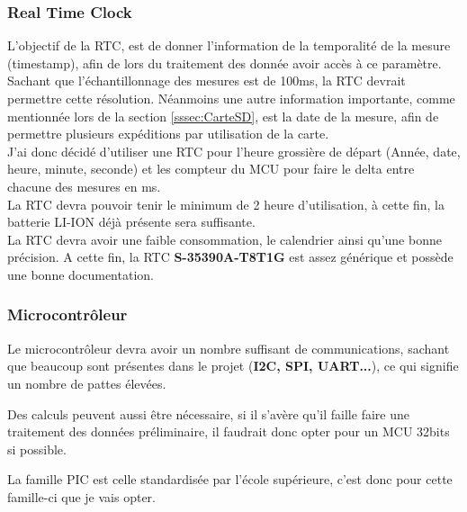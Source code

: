 {\newpage
\subsubsection{Real Time Clock}
{
    L'objectif de la RTC, est de donner l'information de la temporalité de la mesure (timestamp), afin de lors du traitement des donnée avoir accès à ce paramètre. \\
    Sachant que l'échantillonnage des mesures est de 100ms, la RTC devrait permettre cette résolution. Néanmoins une autre information importante, comme mentionnée lors de la section \ref{sssec:CarteSD}, est la date de la mesure, afin de permettre plusieurs expéditions par utilisation de la carte. \vspace{+8pt} \\
    J'ai donc décidé d'utiliser une RTC pour l'heure grossière de départ (Année, date, heure, minute, seconde) et les compteur du MCU pour faire le delta entre chacune des mesures en ms. \\

    La RTC devra pouvoir tenir le minimum de 2 heure d'utilisation, à cette fin, la batterie LI-ION déjà présente sera suffisante. \\ 
    La RTC devra avoir une faible consommation, le calendrier ainsi qu'une bonne précision. A cette fin, la RTC \textbf{S-35390A-T8T1G} est assez générique et possède une bonne documentation.
     
    
}

\subsubsection{Microcontrôleur}
{
    Le microcontrôleur devra avoir un nombre suffisant de communications, sachant que beaucoup sont présentes dans le projet (\textbf{I2C, SPI, UART...}), ce qui signifie un nombre de pattes élevées. 
    
    
    Des calculs peuvent aussi être nécessaire, si il s'avère qu'il faille faire une traitement des données préliminaire, il faudrait donc opter pour un MCU 32bits si possible.


    La famille PIC est celle standardisée par l'école supérieure, c'est donc pour cette famille-ci que je vais opter.
    \vspace{+12pt} \\

}}
